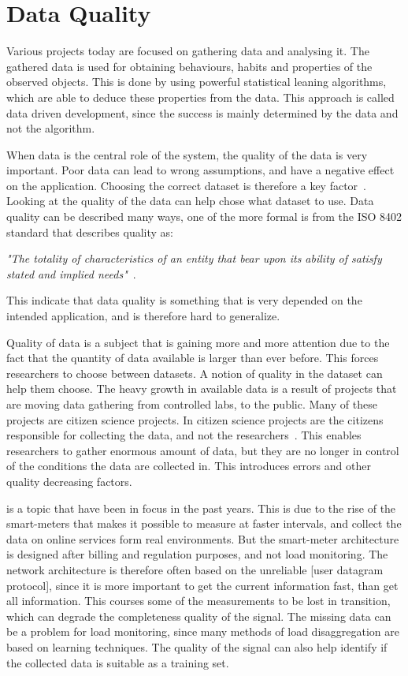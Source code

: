 \chapter{Data Quality}
\label{Sec:DataQuality}
Various projects today are focused on gathering data and analysing it. The gathered data is used for obtaining behaviours, habits and properties of the observed objects. This is done by using powerful statistical leaning algorithms, which are able to deduce these properties from the data. This approach is called data driven development, since the success is mainly determined by the data and not the algorithm. 

When data is the central role of the system, the quality of the data is very important. Poor data can lead to wrong assumptions, and have a negative effect on the application. Choosing the correct dataset is therefore a key factor~\cite{RefWorks:3}. Looking at the quality of the data can help chose what dataset to use. Data quality can be described many ways, one of the more formal is from the ISO 8402 standard that describes quality as: 

\begin{adjustwidth}{2.5em}{2.5em}
\emph{"The totality of characteristics of an entity that bear upon its ability of satisfy stated and implied needs"}~\cite{RefWorks:5}.
\end{adjustwidth}

This indicate that data quality is something that is very depended on the intended application, and is therefore hard to generalize. 

Quality of data is a subject that is gaining more and more attention due to the fact that the quantity of data available is larger than ever before. This forces researchers to choose between datasets. A notion of quality in the dataset can help them choose. The heavy growth in available data is a result of projects that are moving data gathering from controlled labs, to the public. Many of these projects are citizen science projects. In citizen science projects are the citizens responsible for collecting the data, and not the researchers~\cite{RefWorks:2}. This enables researchers to gather enormous amount of data, but they are no longer in control of the conditions the data are collected in. This introduces errors and other quality decreasing factors. 

 is a topic that have been in focus in the past years. This is due to the rise of the smart-meters that makes it possible to measure at faster intervals, and collect the data on online services form real environments. But the smart-meter architecture is designed after billing and regulation purposes, and not load monitoring. The network architecture is therefore often based on the unreliable [user datagram protocol], since it is more important to get the current information fast, than get all information. This courses some of the measurements to be lost in transition, which can degrade the completeness quality of the signal. The missing data can be a problem for load monitoring, since many methods of load disaggregation are based on learning techniques. The quality of the signal can also help identify if the collected data is suitable as a training set. 



